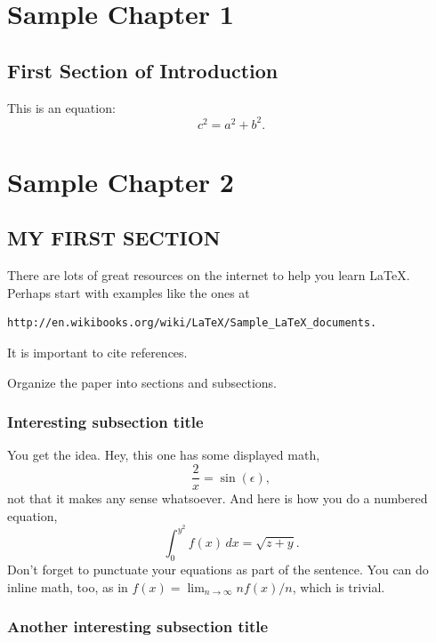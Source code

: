 \documentclass[10pt]{ucthesis}
\begin{document}
\chapter{Sample Chapter 1}
\label{intro}

 \section{First Section of Introduction}
 \label{intro1}
 This is an equation:
 \begin{equation}
 c^2=a^2+b^2.
 \end{equation}










\chapter{Sample Chapter 2}

\section{MY FIRST SECTION}
There are lots of great resources on the internet to help you learn \LaTeX.  
Perhaps start with examples like the ones at 
\begin{verbatim}http://en.wikibooks.org/wiki/LaTeX/Sample_LaTeX_documents.\end{verbatim} 

It is important to cite references.
\cite{Blum, Gill, Ped2}

Organize the paper into sections and subsections.  

\subsection{Interesting subsection title}

You get the idea.  Hey, this one has some displayed math, 
\[
   \frac{2}{x} = \sin(\epsilon), 
\]
not that it makes any sense whatsoever.  And here is how you 
do a numbered equation, 
\begin{equation}
   \int_{0}^{y^2} f(x) \, dx = \sqrt{z+y}.  
\end{equation}
Don't forget to punctuate your equations as part of the sentence.  
You can do inline math, too, as in $f(x) = \lim_{n\to \infty} n f(x)/n$, which is trivial. 

\subsection{Another interesting subsection title}
\end{document}
